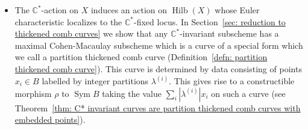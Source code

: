 \documentclass[12pt]{amsart}
\theoremstyle{definition}
\newcommand{\CC} {\mathbb{C}}          %
\newcommand{\Sym}{\operatorname{Sym}}
\newcommand{\Hilb}{\operatorname{Hilb}}
\begin{document}
\begin{itemize}
\item The $\CC^{*}$-action on $X$ induces an action on $\Hilb (X)$
whose Euler characteristic localizes to the $\CC^{*}$-fixed locus.  In
Section~\ref{sec: reduction to thickened comb curves} we show that any
$\CC^{*}$-invariant subscheme has a maximal Cohen-Macaulay subscheme
which is a curve of a special form which we call a partition thickened
comb curve (Definition~\ref{defn: partition thickened comb
curve}). This curve is determined by data consisting of points
$x_{i}\in B$ labelled by integer partitions $\lambda^{(i)}$. This
gives rise to a constructible morphism $\rho$ to $\Sym B$ taking the
value $\sum_{i} |\lambda^{(i)}|x_{i}$ on such a curve (see
Theorem~\ref{thm: C* invariant curves are partition thickened comb
curves with embedded points}).



\end{itemize}
\end{document}
